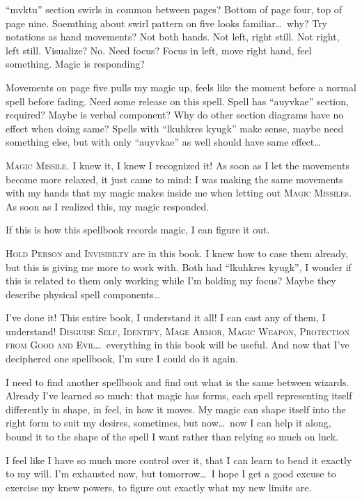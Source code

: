 \pause

``mvktu'' section swirls in common between pages? Bottom of page four, top of page nine. Soemthing about swirl pattern on five looks familiar\dots\ why? Try notations as hand movements? Not both hands. Not left, right still. Not right, left still. Visualize? No. Need focus? Focus in left, move right hand, feel something. Magic is responding?

Movements on page five pulls my magic up, feels like the moment before a normal spell before fading. Need some release on this spell. Spell has ``auyvkae'' section, required? Maybe is verbal component? Why do other section diagrams have no effect when doing same? Spells with ``lkuhkres kyugk'' make sense, maybe need something else, but with only ``auyvkae'' as well should have same effect\dots

\textsc{Magic Missile}. I knew it, I knew I recognized it! As soon as I let the movements become more relaxed, it just came to mind: I was making the same movements with my hands that my magic makes inside me when letting out \textsc{Magic Missile}s. As soon as I realized this, my magic responded.

If this is how this spellbook records magic, I can figure it out.

\textsc{Hold Person} and \textsc{Invisibilty} are in this book. I knew how to case them already, but this is giving me more to work with. Both had ``lkuhkres kyugk'', I wonder if this is related to them only working while I'm holding my focus? Maybe they describe physical spell components\dots

I've done it! This entire book, I understand it all! I can cast any of them, I understand! \textsc{Disguise Self}, \textsc{Identify}, \textsc{Mage Armor}, \textsc{Magic Weapon}, \textsc{Protection from Good and Evil}\dots\ everything in this book will be useful. And now that I've deciphered one spellbook, I'm sure I could do it again.

I need to find another spellbook and find out what is the same between wizards. Already I've learned so much: that magic has forms, each spell representing itself differently in shape, in feel, in how it moves. My magic can shape itself into the right form to suit my desires, sometimes, but now\dots\ now I can help it along, bound it to the shape of the spell I want rather than relying so much on luck.

I feel like I have so much more control over it, that I can learn to bend it exactly to my will. I'm exhausted now, but tomorrow\dots\ I hope I get a good excuse to exercise my knew powers, to figure out exactly what my new limits are.

\sleep

